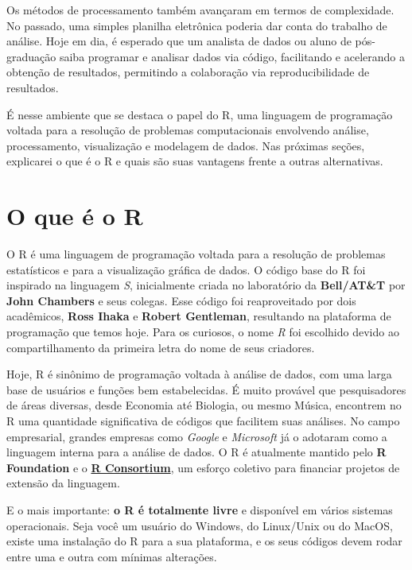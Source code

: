 \documentclass[
  11pt,
]{book}
\begin{document}
Os métodos de processamento também avançaram em termos de complexidade. No passado, uma simples planilha eletrônica poderia dar conta do trabalho de análise. Hoje em dia, é esperado que um analista de dados ou aluno de pós-graduação saiba programar e analisar dados via código, facilitando e acelerando a obtenção de resultados, permitindo a colaboração via reproducibilidade de resultados.

É nesse ambiente que se destaca o papel do R, uma linguagem de programação voltada para a resolução de problemas computacionais envolvendo análise, processamento, visualização e modelagem de dados. Nas próximas seções, explicarei o que é o R e quais são suas vantagens frente a outras alternativas.

\hypertarget{o-que-uxe9-o-r}{%
\section{O que é o R}\label{o-que-uxe9-o-r}}

O R é uma linguagem de programação voltada para a resolução de problemas estatísticos e para a visualização gráfica de dados. O código base do R foi inspirado na linguagem \emph{S}, inicialmente criada no laboratório da \textbf{Bell/AT\&T} por \textbf{John Chambers} e seus colegas. Esse código foi reaproveitado por dois acadêmicos, \textbf{Ross Ihaka} e \textbf{Robert Gentleman}, resultando na plataforma de programação que temos hoje. Para os curiosos, o nome \emph{R} foi escolhido devido ao compartilhamento da primeira letra do nome de seus criadores.

Hoje, R é sinônimo de programação voltada à análise de dados, com uma larga base de usuários e funções bem estabelecidas. É muito provável que pesquisadores de áreas diversas, desde Economia até Biologia, ou mesmo Música, encontrem no R uma quantidade significativa de códigos que facilitem suas análises. No campo empresarial, grandes empresas como \emph{Google} e \emph{Microsoft} já o adotaram como a linguagem interna para a análise de dados. O R é atualmente mantido pelo \textbf{R Foundation} e o \href{https://www.r-consortium.org/}{\textbf{R Consortium}}, um esforço coletivo para financiar projetos de extensão da linguagem.

E o mais importante: \textbf{o R é totalmente livre} e disponível em vários sistemas operacionais. Seja você um usuário do Windows, do Linux/Unix ou do MacOS, existe uma instalação do R para a sua plataforma, e os seus códigos devem rodar entre uma e outra com mínimas alterações.
\end{document}

